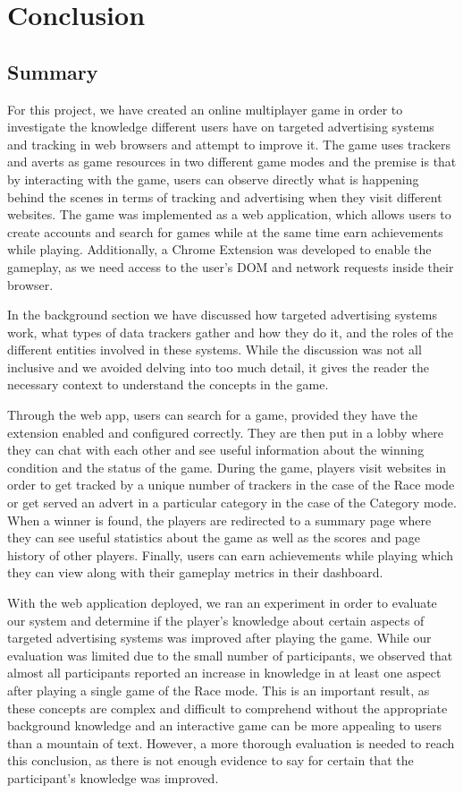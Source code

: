 \documentclass{l4proj}
\begin{document}
\chapter{Conclusion}    

\section{Summary}
For this project, we have created an online multiplayer game in order to investigate the knowledge different users have on targeted advertising systems and tracking in web browsers and attempt to improve it. The game uses trackers and averts as game resources in two different game modes and the premise is that by interacting with the game, users can observe directly what is happening behind the scenes in terms of tracking and advertising when they visit different websites. The game was implemented as a web application, which allows users to create accounts and search for games while at the same time earn achievements while playing. Additionally, a Chrome Extension was developed to enable the gameplay, as we need access to the user's DOM and network requests inside their browser. 

In the background section we have discussed how targeted advertising systems work, what types of data trackers gather and how they do it, and the roles of the different entities involved in these systems. While the discussion was not all inclusive and we avoided delving into too much detail, it gives the reader the necessary context to understand the concepts in the game. 

Through the web app, users can search for a game, provided they have the extension enabled and configured correctly. They are then put in a lobby where they can chat with each other and see useful information about the winning condition and the status of the game. During the game, players visit websites in order to get tracked by a unique number of trackers in the case of the Race mode or get served an advert in a particular category in the case of the Category mode. When a winner is found, the players are redirected to a summary page where they can see useful statistics about the game as well as the scores and page history of other players. Finally, users can earn achievements while playing which they can view along with their gameplay metrics in their dashboard.

With the web application deployed, we ran an experiment in order to evaluate our system and determine if the player's knowledge about certain aspects of targeted advertising systems was improved after playing the game. While our evaluation was limited due to the small number of participants, we observed that almost all participants reported an increase in knowledge in at least one aspect after playing a single game of the Race mode. This is an important result, as these concepts are complex and difficult to comprehend without the appropriate background knowledge and an interactive game can be more appealing to users than a mountain of text. However, a more thorough evaluation is needed to reach this conclusion, as there is not enough evidence to say for certain that the participant's knowledge was improved. 
\end{document}
